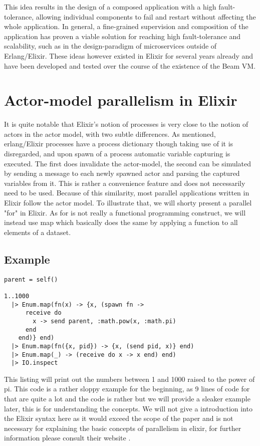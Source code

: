 \documentclass[]{paper}
\begin{document}
This idea results in the design of a composed application with a high fault-tolerance, allowing individual components to fail and restart without affecting the whole application. In general, a fine-grained supervision and composition of the application has proven a viable solution for reaching high fault-tolerance and scalability, such as in the design-paradigm of microservices \cite{microservices} outside of Erlang/Elixir. These ideas however existed in Elixir for several years already and have been developed and tested over the course of the existence of the Beam VM.

\section{Actor-model parallelism in Elixir}

It is quite notable that Elixir's notion of processes is very close to the notion of actors in the actor model, with two subtle differences. As mentioned, erlang/Elixir processes have a process dictionary though taking use of it is disregarded, and upon spawn of a process automatic variable capturing is executed. The first does invalidate the actor-model, the second can be simulated by sending a message to each newly spawned actor and parsing the captured variables from it. This is rather a convenience feature and does not necessarily need to be used. Because of this similarity, most parallel applications written in Elixir follow the actor model. To illustrate that, we will shorty present a parallel "for" in Elixir. As for is not really a functional programming construct, we will instead use map which basically does the same by applying a function to all elements of a dataset.

\subsection{Example}

\begin{lstlisting}
parent = self()

1..1000
  |> Enum.map(fn(x) -> {x, (spawn fn ->
      receive do
        x -> send parent, :math.pow(x, :math.pi)
      end
    end)} end)
  |> Enum.map(fn({x, pid}) -> {x, (send pid, x)} end)
  |> Enum.map(_) -> (receive do x -> x end) end)
  |> IO.inspect
\end{lstlisting}

This listing will print out the numbers between 1 and 1000 raised to the power of pi. This code is a rather sloppy example for the beginning, as 9 lines of code for that are quite a lot and the code is rather but we will provide a sleaker example later, this is for understanding the concepts. We will not give a introduction into the Elixir syntax here as it would exceed the scope of the paper and is not necessary for explaining the basic concepts of parallelism in elixir, for further information please consult their website \cite{Elixir}.
\end{document}
